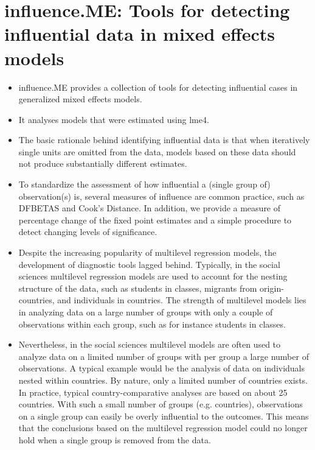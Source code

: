 \documentclass[12pt, a4paper]{article}
\begin{document}
\section{influence.ME: Tools for detecting influential data in mixed effects models}
\begin{itemize}
	\item influence.ME provides a collection of tools for detecting influential cases in generalized mixed effects models. 
	\item It analyses models that were estimated using lme4. 
	\item The basic rationale behind identifying influential data is that when iteratively single units are omitted from the data, 
	models based on these data should not produce substantially different estimates. 
	\item To standardize the assessment of how influential a (single group of) observation(s) is, several measures of influence 
	are common practice, such as DFBETAS and Cook's Distance. In addition, we provide a measure of percentage change of the 
	fixed point estimates and a simple procedure to detect changing levels of significance.
	
	
	
	\item Despite the increasing popularity of multilevel regression models, the development of diagnostic tools lagged behind. Typically, in the social sciences multilevel regression models are used to account for the nesting structure of the data, such as students in classes, migrants from origin-countries, and individuals in countries. The strength of multilevel models lies in analyzing data on a large number of groups with only a couple of observations within each group, such as for instance students in classes.
	
	\item Nevertheless, in the social sciences multilevel models are often used to analyze data on a limited number of groups with per group a large number of observations. A typical example would be the analysis of data on individuals nested within countries. By nature, only a limited number of countries exists. In practice, typical country-comparative analyses are based on about 25 countries. With such a small number of groups (e.g. countries), observations on a single group can easily be overly influential to the outcomes. This means that the conclusions based on the multilevel regression model could no longer hold when a single group is removed from the data.
	

\end{itemize}
\end{document}
